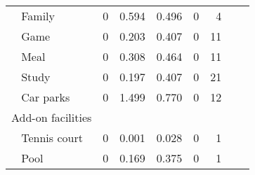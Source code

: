 \begin{table}[ht]
{\begin{threeparttable}
\begin{tabular}{lrrrrrrr}
$~~~~$Family              &0           &0.594  &0.496   &0      &4\\
$~~~~$Game                &0           &0.203  &0.407   &0      &11\\
$~~~~$Meal                &0           &0.308  &0.464   &0      &11\\
$~~~~$Study               &0           &0.197  &0.407   &0      &21\\
$~~~~$Car parks           &0           &1.499  &0.770   &0      &12\\
Add-on facilities\\
$~~~~$Tennis court        &0           &0.001  &0.028   &0      &1\\
$~~~~$Pool                &0           &0.169  &0.375   &0      &1\\
\bottomrule\bottomrule
\end{tabular}
\end{threeparttable}}
\end{table}